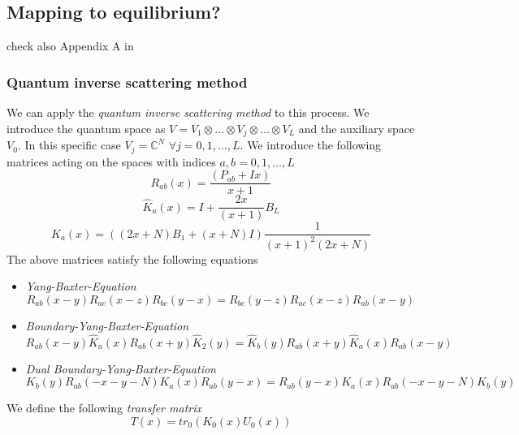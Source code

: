 \documentclass[11pt]{article}
\numberwithin{equation}{section}
\numberwithin{equation}{subsection}
\begin{document}
\subsection{Mapping to equilibrium?}
{\color{red}
check also Appendix A in
\cite{Alcaraz:1992zc} }

\cite{Sklyanin:1988yz}
\subsubsection{Quantum inverse scattering method}
We can apply the \textit{quantum inverse scattering method} to this process. We introduce the quantum space as $V=V_{1}\otimes\ldots\otimes V_{j}\otimes\ldots\otimes V_{L}$ and the auxiliary space $V_{0}$. In this specific case $V_{j}=\mathbb{C}^{N}$ $\forall j=0,1,\ldots ,L$. We introduce the following matrices acting on the spaces with indices $a,b=0,1,\ldots,L$
\begin{equation}\label{Rmatrix}
R_{ab}(x)=\frac{(P_{ab}+Ix)}{x+1}
\end{equation}
\begin{equation}\label{KmatrixHAT}
\widehat{K}_{a}(x)=I+\frac{2x}{(x+1)}B_{L}
\end{equation}
\begin{equation}\label{Kmatrix}
K_{a}(x)=\left((2x+N)B_{1}+(x+N)I\right)\frac{1}{(x+1)^{2}(2x+N)}
\end{equation}
The above matrices satisfy the following equations
\begin{itemize}
\item \textit{Yang-Baxter-Equation}
\begin{equation}
R_{ab}(x-y)R_{ac}(x-z)R_{bc}(y-x)=R_{bc}(y-z)R_{ac}(x-z)R_{ab}(x-y)
\end{equation}
\item \textit{Boundary-Yang-Baxter-Equation}
\begin{equation}
R_{ab}(x-y)\widehat{K}_{a}(x)R_{ab}(x+y)\widehat{K}_{2}(y)=\widehat{K}_{b}(y)R_{ab}(x+y)\widehat{K}_{a}(x)R_{ab}(x-y)
\end{equation}
\item \textit{Dual Boundary-Yang-Baxter-Equation}
\begin{equation}
K_{b}(y) R_{ab}(-x-y-N) K_{a}(x)R_{ab}(y-x)=R_{ab}(y-x)K_{a}(x)R_{ab}(-x-y-N)K_{b}(y)
\end{equation}
\end{itemize}
We define the following \textit{transfer matrix}
\begin{equation}
	T(x)=tr_{0}\left(K_{0}(x)U_{0}(x)\right)
\end{equation}
\end{document}
